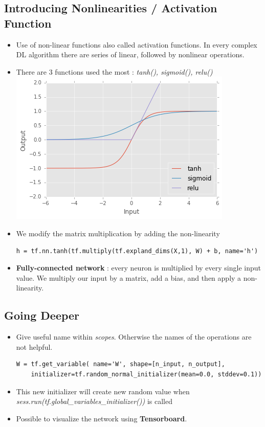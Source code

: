\documentclass[12pt,a4paper]{article}
\begin{document}
\subsection{Introducing Nonlinearities / Activation Function}
\begin{itemize}
\item Use of non-linear functions also called activation functions. In every complex DL algorithm there are series of linear, followed by nonlinear operations.
\item There are 3 functions used the most : \textit{tanh(), sigmoid(), relu()}\\
\includegraphics[scale=0.5]{nonLinearities}
\item We modify the matrix multiplication by adding the non-linearity
\begin{lstlisting}
h = tf.nn.tanh(tf.multiply(tf.expland_dims(X,1), W) + b, name='h')
\end{lstlisting}
\item \textbf{Fully-connected network} : every neuron is multiplied by every single input value. We multiply our input by a matrix, add a bias, and then apply a non-linearity.
\end{itemize}
\subsection{Going Deeper}
\begin{itemize}
\item Give useful name within \textit{scopes}. Otherwise the names of the operations are not helpful.
\begin{lstlisting}
W = tf.get_variable( name='W', shape=[n_input, n_output],
    initializer=tf.random_normal_initializer(mean=0.0, stddev=0.1))
\end{lstlisting}
\item This new initializer will create new random value when\\
\textit{sess.run(tf.global\_variables\_initializer())} is called
\item Possible to visualize the network using \textbf{Tensorboard}.
\end{itemize}
\end{document}
